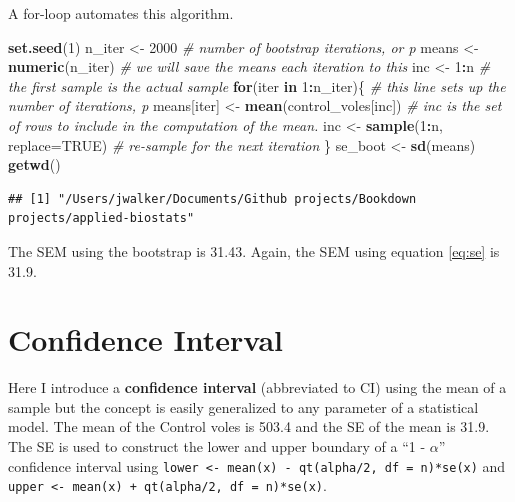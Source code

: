 \documentclass[]{book}
\newenvironment{Shaded}{\begin{snugshade}}{\end{snugshade}}
\newcommand{\KeywordTok}[1]{\textcolor[rgb]{0.13,0.29,0.53}{\textbf{#1}}}
\newcommand{\DataTypeTok}[1]{\textcolor[rgb]{0.13,0.29,0.53}{#1}}
\newcommand{\DecValTok}[1]{\textcolor[rgb]{0.00,0.00,0.81}{#1}}
\newcommand{\StringTok}[1]{\textcolor[rgb]{0.31,0.60,0.02}{#1}}
\newcommand{\CommentTok}[1]{\textcolor[rgb]{0.56,0.35,0.01}{\textit{#1}}}
\newcommand{\OtherTok}[1]{\textcolor[rgb]{0.56,0.35,0.01}{#1}}
\newcommand{\ControlFlowTok}[1]{\textcolor[rgb]{0.13,0.29,0.53}{\textbf{#1}}}
\newcommand{\OperatorTok}[1]{\textcolor[rgb]{0.81,0.36,0.00}{\textbf{#1}}}
\newcommand{\NormalTok}[1]{#1}
\begin{document}
A for-loop automates this algorithm.

\begin{Shaded}
\begin{Highlighting}[]
\KeywordTok{set.seed}\NormalTok{(}\DecValTok{1}\NormalTok{)}
\NormalTok{n_iter <-}\StringTok{ }\DecValTok{2000} \CommentTok{# number of bootstrap iterations, or p}
\NormalTok{means <-}\StringTok{ }\KeywordTok{numeric}\NormalTok{(n_iter) }\CommentTok{# we will save the means each iteration to this}
\NormalTok{inc <-}\StringTok{ }\DecValTok{1}\OperatorTok{:}\NormalTok{n }\CommentTok{# the first sample is the actual sample}
\ControlFlowTok{for}\NormalTok{(iter }\ControlFlowTok{in} \DecValTok{1}\OperatorTok{:}\NormalTok{n_iter)\{ }\CommentTok{# this line sets up the number of iterations, p}
\NormalTok{  means[iter] <-}\StringTok{ }\KeywordTok{mean}\NormalTok{(control_voles[inc]) }\CommentTok{# inc is the set of rows to include in the computation of the mean.}
\NormalTok{  inc <-}\StringTok{ }\KeywordTok{sample}\NormalTok{(}\DecValTok{1}\OperatorTok{:}\NormalTok{n, }\DataTypeTok{replace=}\OtherTok{TRUE}\NormalTok{) }\CommentTok{# re-sample for the next iteration}
\NormalTok{\}}
\NormalTok{se_boot <-}\StringTok{ }\KeywordTok{sd}\NormalTok{(means)}
\KeywordTok{getwd}\NormalTok{()}
\end{Highlighting}
\end{Shaded}

\begin{verbatim}
## [1] "/Users/jwalker/Documents/Github projects/Bookdown projects/applied-biostats"
\end{verbatim}

The SEM using the bootstrap is 31.43. Again, the SEM using equation
\eqref{eq:se} is 31.9.

\section{Confidence Interval}\label{confidence-interval}

Here I introduce a \textbf{confidence interval} (abbreviated to CI)
using the mean of a sample but the concept is easily generalized to any
parameter of a statistical model. The mean of the Control voles is 503.4
and the SE of the mean is 31.9. The SE is used to construct the lower
and upper boundary of a ``1 - \(\alpha\)'' confidence interval using
\texttt{lower\ \textless{}-\ mean(x)\ -\ qt(alpha/2,\ df\ =\ n)*se(x)}
and
\texttt{upper\ \textless{}-\ mean(x)\ +\ qt(alpha/2,\ df\ =\ n)*se(x)}.
\end{document}
